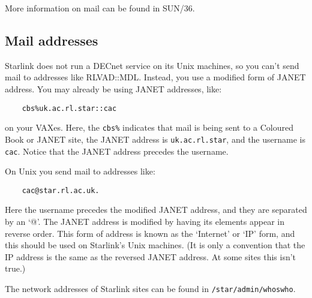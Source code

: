 More information on mail can be found in SUN/36.

\subsection{Mail addresses}

Starlink does not run a DECnet service on its Unix machines, so you can't send
mail to addresses like RLVAD::MDL.
Instead, you use a modified form of JANET address.
You may already be using JANET addresses, like:
\begin{verbatim}
    cbs%uk.ac.rl.star::cac
\end{verbatim}
on your VAXes.
Here, the {\tt cbs\%} indicates that mail is being sent to a Coloured Book or
JANET site, the JANET address is {\tt uk.ac.rl.star}, and the username is
{\tt cac}.
Notice that the JANET address precedes the username.

On Unix you send mail to addresses like:
\begin{verbatim}
    cac@star.rl.ac.uk.
\end{verbatim}
Here the username precedes the modified JANET address, and they are separated
by an `@'.
The JANET address is modified by having its elements appear in reverse order.
This form of address is known as the `Internet' or `IP' form, and this
should be used on Starlink's Unix machines. 
(It is only a convention that the IP address is the same as the reversed JANET
address.  At some sites this isn't true.)

The network addresses of Starlink sites can be found in
{\tt /star/admin/whoswho}.

